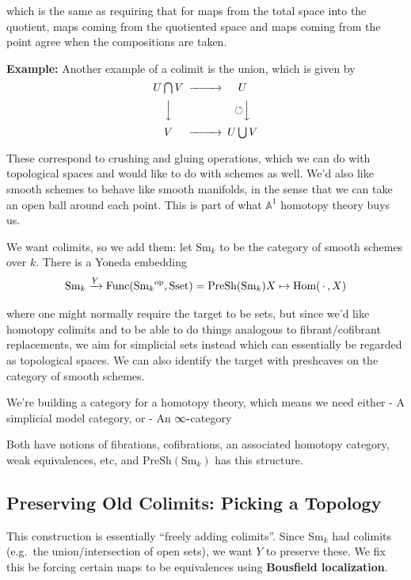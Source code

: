 \documentclass[11pt]{scrreprt}
\theoremstyle{definition}
\newcommand{\Af}[0]{{\mathbb{A}}}
\newcommand{\mapsvia}[1]{\xrightarrow{#1}}
\newcommand{\intersect}[0]{\bigcap}
\newcommand{\union}[0]{\bigcup}
\newcommand{\wait}[0]{{\,\cdot\,}}
\newcommand{\selfmap}[0]{{\circlearrowleft}}
\newcommand{\dash}[0]{{\hbox{-}}}
\newcommand{\Sm}[0]{{\text{Sm}_k}}
\renewcommand{\hom}[0]{\text{Hom}}
\begin{document}
which is the same as requiring that for maps from the total space into
the quotient, maps coming from the quotiented space and maps coming from
the point agree when the compositions are taken.

\textbf{Example:} Another example of a colimit is the union, which is
given by \[
\begin{CD}
  U\intersect V @>>> U \\
  @VVV \selfmap @VVV \\
  V @>>> U \union V
\end{CD}
\]

These correspond to crushing and gluing operations, which we can do with
topological spaces and would like to do with schemes as well. We'd also
like smooth schemes to behave like smooth manifolds, in the sense that
we can take an open ball around each point. This is part of what
\(\Af^1\) homotopy theory buys us.

We want colimits, so we add them: let \(\Sm\) to be the category of
smooth schemes over \(k\). There is a Yoneda embedding \[
\Sm \mapsvia{Y} \operatorname{Func}(\Sm^\text{op}, \operatorname{Sset}) = \text{PreSh}(\Sm) \\
X \mapsto \hom(\wait, X)
\]

where one might normally require the target to be sets, but since we'd
like homotopy colimits and to be able to do things analogous to
fibrant/cofibrant replacements, we aim for simplicial sets instead which
can essentially be regarded as topological spaces. We can also identify
the target with presheaves on the category of smooth schemes.

We're building a category for a homotopy theory, which means we need
either - A simplicial model category, or - An \(\infty\dash\)category

Both have notions of fibrations, cofibrations, an associated homotopy
category, weak equivalences, etc, and \(\text{PreSh}(\Sm)\) has this
structure.

\hypertarget{preserving-old-colimits-picking-a-topology}{%
\subsection{Preserving Old Colimits: Picking a
Topology}\label{preserving-old-colimits-picking-a-topology}}

This construction is essentially ``freely adding colimits''. Since
\(\Sm\) had colimits (e.g.~the union/intersection of open sets), we want
\(Y\) to preserve these. We fix this be forcing certain maps to be
equivalences using \textbf{Bousfield localization}.
\end{document}
